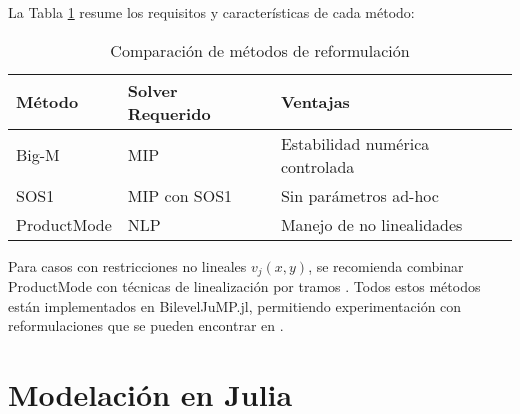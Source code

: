 La Tabla \ref{tab:comparacion_metodos} resume los requisitos y características de cada método:

\begin{table}[H]
\centering
\begin{tabular}{l|l|l}
\textbf{Método} & \textbf{Solver Requerido} & \textbf{Ventajas} \\ \hline
Big-M & MIP & Estabilidad numérica controlada \\
SOS1 & MIP con SOS1 & Sin parámetros ad-hoc \\
ProductMode & NLP & Manejo de no linealidades \\
\end{tabular}
\caption{Comparación de métodos de reformulación}
\label{tab:comparacion_metodos}
\end{table}

Para casos con restricciones no lineales $v_j(x,y)$, se recomienda combinar ProductMode con técnicas de linealización por tramos \cite[Apéndice B]{BilevelJump}. Todos estos métodos están implementados en BilevelJuMP.jl, permitiendo experimentación con reformulaciones que se pueden encontrar en \cite[Sección 4]{BilevelJump}.


\section{Modelación en Julia}

